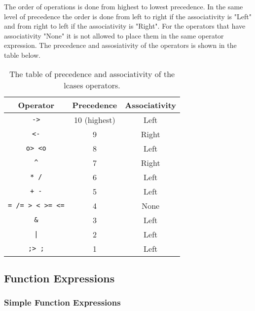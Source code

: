 \documentclass{article}
\begin{document}
The order of operations is done from highest to lowest precedence. In the same
level of precedence the order is done from left to right if the associativity
is "Left" and from right to left if the associativity is "Right". For the
operators that have associativity "None" it is not allowed to place them in the
same operator expression. The precedence and assosiativity of the operators
is shown in the table below.
\begin{table}[h!]

\caption{ The table of precedence and associativity of the lcases operators.  }

\begin{center}
\begin{tabular}{ |c|c|c| } 
\hline
Operator & Precedence & Associativity \\ 
\hline
\hline
\texttt{->} & 10 (highest) & Left \\
\hline
\texttt{<-} & 9 & Right \\
\hline
\texttt{o> <o} & 8 & Left \\
\hline
\texttt{\^} & 7 & Right \\
\hline
\texttt{* /} & 6 & Left \\
\hline
\texttt{+ -} & 5 & Left \\ 
\hline
\texttt{= /= > < >= <=} & 4 & None \\
\hline
\texttt{\&} & 3 & Left \\
\hline
\texttt{|} & 2 & Left \\
\hline
\texttt{;> ;} & 1 & Left \\
\hline
\end{tabular}
\end{center}

\label{table:precassoc}

\end{table}

\newpage
\subsection{Function Expressions}
\label{subsec:funcexprs}

\subsubsection{Simple Function Expressions}
\end{document}
